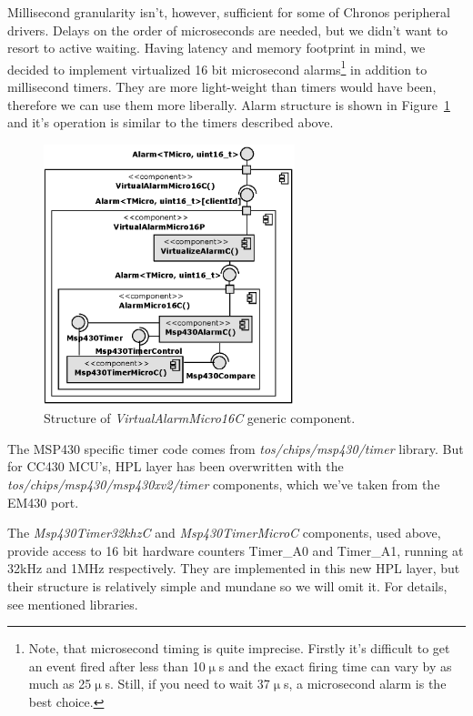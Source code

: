 Millisecond granularity isn't, however, sufficient for some of Chronos peripheral drivers. Delays on the order of microseconds are needed, but we didn't want to resort to active waiting. Having latency and memory footprint in mind, we decided to implement virtualized 16 bit microsecond alarms\footnote{Note, that microsecond timing is quite imprecise. Firstly it's difficult to get an event fired after less than 10$\upmu$s and the exact firing time can vary by as much as 25$\upmu$s. Still, if you need to wait 37$\upmu$s, a microsecond alarm is the best choice.} in addition to millisecond timers. They are more light-weight than timers would have been, therefore we can use them more liberally. Alarm structure is shown in Figure~\ref{fig:virutal_alarm_micro_16_c} and it's operation is similar to the timers described above.
\begin{figure}[h]
  \centering
  \includegraphics[width=0.65\textwidth]{diagrams/virutal_alarm_micro_16_c.eps}
  \caption{Structure of \emph{VirtualAlarmMicro16C} generic component.}
  \label{fig:virutal_alarm_micro_16_c}
\end{figure}

The MSP430 specific timer code comes from \emph{tos/chips/msp430/timer} library. But for CC430 MCU's, HPL layer has been overwritten with the \emph{tos/chips/msp430/msp430xv2/timer} components, which we've taken from the EM430 port.

The \emph{Msp430Timer32khzC} and  \emph{Msp430TimerMicroC} components, used above, provide access to 16 bit hardware counters Timer\_A0 and Timer\_A1, running at 32kHz and 1MHz respectively. They are implemented in this new HPL layer, but their structure is relatively simple and mundane so we will omit it. For details, see mentioned libraries.

